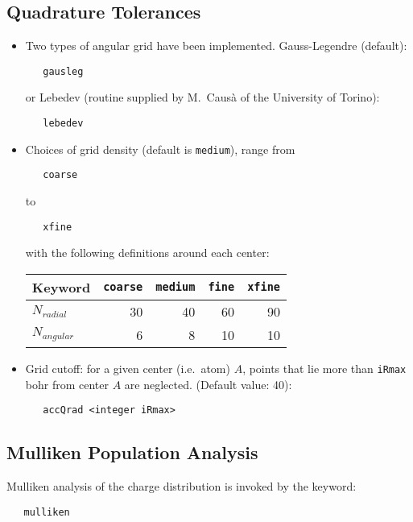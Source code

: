 \subsection{Quadrature Tolerances}
\begin{itemize}
\item Two types of angular grid have been implemented.
  Gauss-Legendre (default):
\begin{verbatim}
   gausleg
\end{verbatim}
or Lebedev (routine supplied by M.~Caus\`a of the University of Torino):
\begin{verbatim}
   lebedev
\end{verbatim}
\item Choices of grid density (default is {\tt medium}), range from 
\begin{verbatim}
   coarse
\end{verbatim}
to
\begin{verbatim}
   xfine
\end{verbatim}
with the following definitions around each center:

  \begin{tabular}[right]{|l|r r r r|} \hline
Keyword & {\tt coarse} & {\tt medium} & {\tt fine} & {\tt xfine} \\ \hline
$N_{radial}$ & 30 & 40 & 60 & 90 \\
$N_{angular}$ & 6 & 8 & 10 & 10 \\  \hline
  \end{tabular}

\item Grid cutoff: for a given center (i.e.~atom) $A$, points that lie
more than {\tt iRmax} bohr from center $A$ are neglected. (Default value: 40):
\begin{verbatim}
   accQrad <integer iRmax>
\end{verbatim}
\end{itemize}

\subsection{Mulliken Population Analysis}
Mulliken analysis of the charge distribution is invoked by the keyword:
\begin{verbatim}
   mulliken
\end{verbatim}




